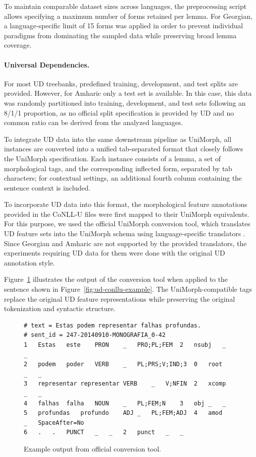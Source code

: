 To maintain comparable dataset sizes across languages, the preprocessing script allows specifying a maximum number of forms retained per lemma. For Georgian, a language-specific limit of 15 forms was applied in order to prevent individual paradigms from dominating the sampled data while preserving broad lemma coverage.

\paragraph{Universal Dependencies.}

For most \ac{UD} treebanks, predefined training, development, and test splits are provided. However, for Amharic only a test set is available. In this case, this data was randomly partitioned into training, development, and test sets following an 8/1/1 proportion, as no official split specification is provided by \ac{UD} and no common ratio can be derived from the analyzed languages.

To integrate \ac{UD} data into the same downstream pipeline as UniMorph, all instances are converted into a unified tab-separated format that closely follows the UniMorph specification. Each instance consists of a lemma, a set of morphological tags, and the corresponding inflected form, separated by tab characters; for contextual settings, an additional fourth column containing the sentence context is included.

To incorporate \ac{UD} data into this format, the morphological feature annotations provided in the CoNLL-U files were first mapped to their UniMorph equivalents. For this purpose, we used the official UniMorph conversion tool, which translates \ac{UD} feature sets into the UniMorph schema using language-specific translators \parencite{mccarthy-etal-2018-marrying}. Since Georgian and Amharic are not supported by the provided translators, the experiments requiring \ac{UD} data for them were done with the original \ac{UD} annotation style.

Figure~\ref{fig:marry-example} illustrates the output of the conversion tool when applied to the sentence shown in Figure~\ref{fig:ud-conllu-example}. The UniMorph-compatible tags replace the original \ac{UD} feature representations while preserving the original tokenization and syntactic structure.

\begin{figure}[h]
\centering
\begin{BVerbatim}[fontsize=\footnotesize,tabsize=2]
# text = Estas podem representar falhas profundas.
# sent_id = 247-20140910-MONOGRAFIA_0-42
1	Estas	este	PRON	_	PRO;PL;FEM	2	nsubj	_	_
2	podem	poder	VERB	_	PL;PRS;V;IND;3	0	root	_	_
3	representar	representar	VERB	_	V;NFIN	2	xcomp	_	_
4	falhas	falha	NOUN	_	PL;FEM;N	3	obj	_	_
5	profundas	profundo	ADJ	_	PL;FEM;ADJ	4	amod	_	SpaceAfter=No
6	.	.	PUNCT	_	_	2	punct	_	_
\end{BVerbatim}
\caption{Example output from official conversion tool.}
\label{fig:marry-example}
\end{figure}

